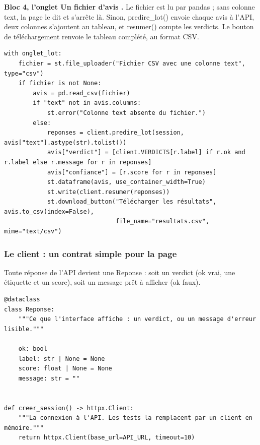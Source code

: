 \documentclass[11pt,a4paper]{article}
\newcommand{\co}[1]{{\ttfamily\hyphenchar\font=45\relax #1}}
\begin{document}
\textbf{Bloc 4, l'onglet \og Un fichier d'avis \fg{}.} Le fichier est lu par pandas ; sans colonne
\co{text}, la page le dit et s'arrête là. Sinon, \co{predire\_lot()} envoie chaque avis à l'API, deux colonnes
s'ajoutent au tableau, et \co{resumer()} compte les verdicts. Le bouton de téléchargement renvoie le tableau
complété, au format CSV.

\begin{lstlisting}[basicstyle=\ttfamily\footnotesize]
with onglet_lot:
    fichier = st.file_uploader("Fichier CSV avec une colonne text", type="csv")
    if fichier is not None:
        avis = pd.read_csv(fichier)
        if "text" not in avis.columns:
            st.error("Colonne text absente du fichier.")
        else:
            reponses = client.predire_lot(session, avis["text"].astype(str).tolist())
            avis["verdict"] = [client.VERDICTS[r.label] if r.ok and r.label else r.message for r in reponses]
            avis["confiance"] = [r.score for r in reponses]
            st.dataframe(avis, use_container_width=True)
            st.write(client.resumer(reponses))
            st.download_button("Télécharger les résultats", avis.to_csv(index=False),
                               file_name="resultats.csv", mime="text/csv")
\end{lstlisting}

\subsubsection{Le client : un contrat simple pour la page}

Toute réponse de l'API devient une \co{Reponse} : soit un verdict (\co{ok} vrai, une étiquette et un score),
soit un message prêt à afficher (\co{ok} faux).

\begin{lstlisting}[basicstyle=\ttfamily\footnotesize]
@dataclass
class Reponse:
    """Ce que l'interface affiche : un verdict, ou un message d'erreur lisible."""

    ok: bool
    label: str | None = None
    score: float | None = None
    message: str = ""


def creer_session() -> httpx.Client:
    """La connexion à l'API. Les tests la remplacent par un client en mémoire."""
    return httpx.Client(base_url=API_URL, timeout=10)
\end{lstlisting}
\end{document}
